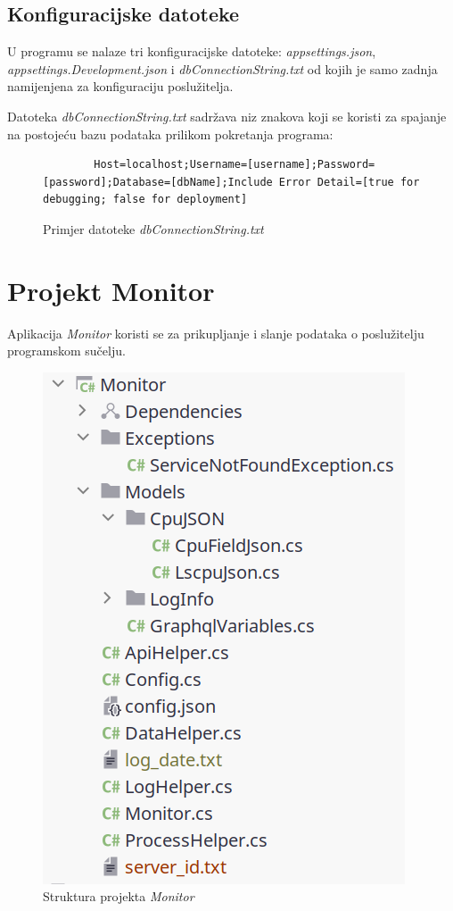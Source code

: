 \documentclass[zavrsnirad]{fer}
\begin{document}
\subsection{Konfiguracijske datoteke}
U programu se nalaze tri konfiguracijske datoteke: \textit{appsettings.json}, \textit{appsettings.Development.json} i \textit{dbConnectionString.txt} od kojih je samo zadnja namijenjena za konfiguraciju poslužitelja.

Datoteka \textit{dbConnectionString.txt} sadržava niz znakova koji se koristi za spajanje na postojeću bazu podataka prilikom pokretanja programa:
\begin{figure}[htb]
	\centering
	\begin{lstlisting}
		Host=localhost;Username=[username];Password=[password];Database=[dbName];Include Error Detail=[true for debugging; false for deployment]
	\end{lstlisting}
	\caption{Primjer datoteke \textit{dbConnectionString.txt}}
\end{figure}
\FloatBarrier

\section{Projekt Monitor}
Aplikacija \textit{Monitor} koristi se za prikupljanje i slanje podataka o poslužitelju programskom sučelju.

\begin{figure}[htb!]
	\centering
	\includegraphics[width=0.4\linewidth]{images/monitor_structure.png} 
	\caption{Struktura projekta \textit{Monitor}}
	\label{slk:monitor_structure.png}
\end{figure}
\FloatBarrier
\end{document}
